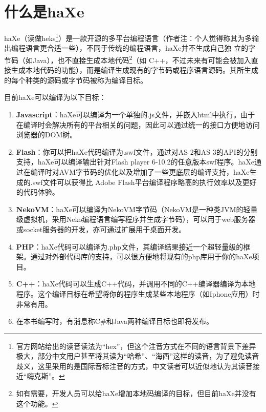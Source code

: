 \section{什么是haXe}

haXe（读做\/heks\/\footnote{官方网站给出的读音读法为“hex”，但这个注音方式在不同的语言背景下差异极大，部分中文用户甚至将其读为“哈希”、“海西”这样的读音，为了避免读音歧义，这里采用的是国际音标注音的方式，中文读者可以近似地认为其读音接近“嗨克斯”。}）是一款开源的多平台编程语言（作者注：个人觉得称其为多输出编程语言更合适一些），不同于传统的编程语言，haXe并不生成自己独 立的字节码（如Java），也不直接生成本地代码\footnote{如有需要，开发人员可以给haXe增加本地码编译的目标，但目前haXe并没有这个功能。}（如 C++，不过未来有可能会被加入直接生成本地代码的功能），而是编译生成现有的字节码或程序语言源码。其所生成的每个种类的源码或字节码被称为编译目标。

目前haXe可以编译为以下目标：

\begin{enumerate}
\item {{\bf Javascript}：haXe可以编译为一个单独的.js文件，并嵌入html中执行。由于在编译时会解决所有的平台相关的问题，因此可以通过统一的接口方便地访问浏览器的DOM树。}
\item {{\bf Flash}：你可以把haXe代码编译为.swf文件，通过对AS 2和AS 3的API的分别支持，haXe可以编译输出针对Flash player 6-10.2的任意版本swf程序。haXe通过在编译时对AVM字节码的优化以及增加了一些更底层的编译支持，haXe生成的.swf文件可以获得比 Adobe Flash平台编译程序略高的执行效率以及更好的代码体验。 }
\item {{\bf NekoVM}：haXe可以编译为NekoVM字节码（NekoVM是一种类JVM的轻量级虚拟机，采用Neko编程语言编写程序并生成字节码），可以用于web服务器或socket服务器的开发，亦可通过扩展用于桌面开发。}
\item {{\bf PHP}：haXe代码可以编译为.php文件，其编译结果接近一个超轻量级的框架。通过对外部代码库的支持，可以很方便地将现有的php库用于你的haXe项目。}
\item {{\bf C++}：haXe代码可以生成C++代码，并调用不同的C++编译器编译为本地程序。这个编译目标在希望将你的程序生成某些本地程序（如Iphone应用）时非常有用。}
\item {在本书编写时，有消息称C\#和Java两种编译目标也即将发布。}
\end{enumerate}

